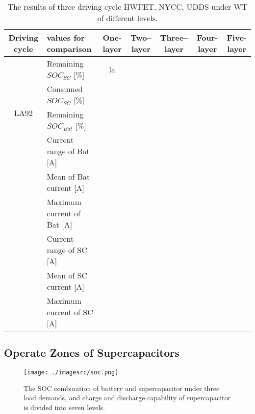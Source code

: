 \documentclass[energies,article,submit,moreauthors,pdftex,10pt,a4paper]{Definitions/mdpi}
\begin{document}
\begin{table*}[ht]
\begin{center}
\caption{\\The results of three driving cycle  HWFET, NYCC, UDDS under WT of different levels.}\label{tb:table1}
\begin{tabular}{clccccc}
\toprule  %
Driving cycle & values for comparison & One-layer & Two--layer & Three--layer& Four-layer & Five-layer\\
\hline
\multirow{4}[8]{1in}{LA92} 
&  Remaining $SOC_{SC}$ [\%]  & la \bigstrut\\
&  Consumed ${SOC_{SC}}$ [\%]  & \bigstrut\\
&  Remaining ${SOC_{Bat}}$ [\%]  &  \bigstrut\\
& Current range of Bat [A] &\bigstrut\\
& Mean of Bat current [A] &\bigstrut\\
& Maximum current of Bat [A] &\bigstrut\\
& Current range of SC [A] &\bigstrut\\
& Mean of SC current [A] &\bigstrut\\
& Maximum current of SC [A] \bigstrut\\
\bottomrule %
\end{tabular}
\end{center}
\end{table*}

\subsection{Operate Zones of Supercapacitors}

\begin{figure*}[!t]
\centering
\texttt{[image: ./imagesrc/soc.png]}
\caption{The SOC combination of battery and supercapacitor under three load demands, and  charge and discharge capability of supercapacitor is divided into seven levels.}
\label{SoCMap}
\end{figure*}
\end{document}
